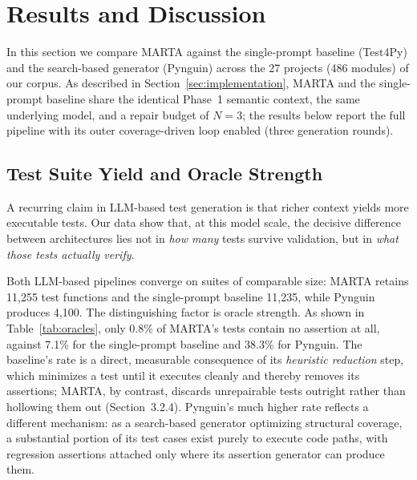 %
%

\section{Results and Discussion}

In this section we compare MARTA against the single-prompt baseline (Test4Py) and
the search-based generator (Pynguin) across the 27 projects (486 modules) of our
corpus. As described in Section~\ref{sec:implementation}, MARTA and the
single-prompt baseline share the identical Phase~1 semantic context, the same
underlying model, and a repair budget of $N=3$; the results below report the full
pipeline with its outer coverage-driven loop enabled (three generation rounds).

\subsection{Test Suite Yield and Oracle Strength}

A recurring claim in LLM-based test generation is that richer context yields more
executable tests. Our data show that, at this model scale, the decisive difference
between architectures lies not in \emph{how many} tests survive validation, but in
\emph{what those tests actually verify}.

Both LLM-based pipelines converge on suites of comparable size: MARTA retains
11{,}255 test functions and the single-prompt baseline 11{,}235, while Pynguin
produces 4{,}100. The distinguishing factor is oracle strength. As shown in
Table~\ref{tab:oracles}, only 0.8\% of MARTA's tests contain no assertion at all,
against 7.1\% for the single-prompt baseline and 38.3\% for Pynguin. The baseline's
rate is a direct, measurable consequence of its \emph{heuristic reduction} step,
which minimizes a test until it executes cleanly and thereby removes its assertions;
MARTA, by contrast, discards unrepairable tests outright rather than hollowing them
out (Section~3.2.4). Pynguin's much higher rate reflects a different mechanism: as a
search-based generator optimizing structural coverage, a substantial portion of its
test cases exist purely to execute code paths, with regression assertions attached
only where its assertion generator can produce them.

